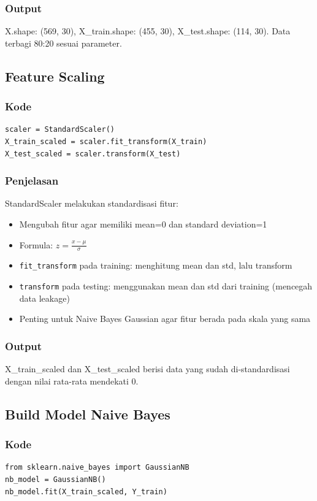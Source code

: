 \documentclass[12pt,a4paper]{article}
\begin{document}
\subsubsection{Output}
X.shape: (569, 30), X\_train.shape: (455, 30), X\_test.shape: (114, 30). Data terbagi 80:20 sesuai parameter.

\subsection{Feature Scaling}

\subsubsection{Kode}
\begin{lstlisting}[style=pythonstyle]
scaler = StandardScaler()
X_train_scaled = scaler.fit_transform(X_train)
X_test_scaled = scaler.transform(X_test)
\end{lstlisting}

\subsubsection{Penjelasan}
StandardScaler melakukan standardisasi fitur:
\begin{itemize}
    \item Mengubah fitur agar memiliki mean=0 dan standard deviation=1
    \item Formula: $z = \frac{x - \mu}{\sigma}$
    \item \texttt{fit\_transform} pada training: menghitung mean dan std, lalu transform
    \item \texttt{transform} pada testing: menggunakan mean dan std dari training (mencegah data leakage)
    \item Penting untuk Naive Bayes Gaussian agar fitur berada pada skala yang sama
\end{itemize}

\subsubsection{Output}
X\_train\_scaled dan X\_test\_scaled berisi data yang sudah di-standardisasi dengan nilai rata-rata mendekati 0.

\subsection{Build Model Naive Bayes}

\subsubsection{Kode}
\begin{lstlisting}[style=pythonstyle]
from sklearn.naive_bayes import GaussianNB
nb_model = GaussianNB()
nb_model.fit(X_train_scaled, Y_train)
\end{lstlisting}
\end{document}
